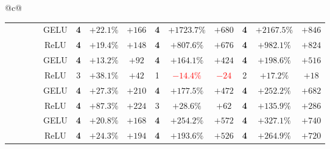 \begin{tabular}{@{}c@{}}
\begin{tabular}{@{}ccccc|ccccccccc@{}}
\hdashline[1pt/3pt]
\xmark & \cmark & \cmark & \cmark & GELU & \textbf{4} & \textcolor{green!55!black}{$+22.1\%$} & \textcolor{green!55!black}{$+166$} & \textbf{4} & \textcolor{green!55!black}{$+1723.7\%$} & \textcolor{green!55!black}{$+680$} & \textbf{4} & \textcolor{green!55!black}{$+2167.5\%$} & \textcolor{green!55!black}{$+846$} \\
\xmark & \cmark & \cmark & \cmark & ReLU & \textbf{4} & \textcolor{green!55!black}{$+19.4\%$} & \textcolor{green!55!black}{$+148$} & \textbf{4} & \textcolor{green!55!black}{$+807.6\%$} & \textcolor{green!55!black}{$+676$} & \textbf{4} & \textcolor{green!55!black}{$+982.1\%$} & \textcolor{green!55!black}{$+824$} \\
\midrule
\cmark & \cmark & \xmark & \xmark & GELU & \textbf{4} & \textcolor{green!55!black}{$+13.2\%$} & \textcolor{green!55!black}{$+92$} & \textbf{4} & \textcolor{green!55!black}{$+164.1\%$} & \textcolor{green!55!black}{$+424$} & \textbf{4} & \textcolor{green!55!black}{$+198.6\%$} & \textcolor{green!55!black}{$+516$} \\
\cmark & \cmark & \xmark & \xmark & ReLU & 3 & \textcolor{green!55!black}{$+38.1\%$} & \textcolor{green!55!black}{$+42$} & 1 & \textcolor{red}{$-14.4\%$} & \textcolor{red}{$-24$} & 2 & \textcolor{green!55!black}{$+17.2\%$} & \textcolor{green!55!black}{$+18$} \\
\hdashline[1pt/3pt]
\cmark & \cmark & \xmark & \cmark & GELU & \textbf{4} & \textcolor{green!55!black}{$+27.3\%$} & \textcolor{green!55!black}{$+210$} & \textbf{4} & \textcolor{green!55!black}{$+177.5\%$} & \textcolor{green!55!black}{$+472$} & \textbf{4} & \textcolor{green!55!black}{$+252.2\%$} & \textcolor{green!55!black}{$+682$} \\
\cmark & \cmark & \xmark & \cmark & ReLU & \textbf{4} & \textcolor{green!55!black}{$+87.3\%$} & \textcolor{green!55!black}{$+224$} & 3 & \textcolor{green!55!black}{$+28.6\%$} & \textcolor{green!55!black}{$+62$} & \textbf{4} & \textcolor{green!55!black}{$+135.9\%$} & \textcolor{green!55!black}{$+286$} \\
\hdashline[1pt/3pt]
\cmark & \cmark & \cmark & \xmark & GELU & \textbf{4} & \textcolor{green!55!black}{$+20.8\%$} & \textcolor{green!55!black}{$+168$} & \textbf{4} & \textcolor{green!55!black}{$+254.2\%$} & \textcolor{green!55!black}{$+572$} & \textbf{4} & \textcolor{green!55!black}{$+327.1\%$} & \textcolor{green!55!black}{$+740$} \\
\cmark & \cmark & \cmark & \xmark & ReLU & \textbf{4} & \textcolor{green!55!black}{$+24.3\%$} & \textcolor{green!55!black}{$+194$} & \textbf{4} & \textcolor{green!55!black}{$+193.6\%$} & \textcolor{green!55!black}{$+526$} & \textbf{4} & \textcolor{green!55!black}{$+264.9\%$} & \textcolor{green!55!black}{$+720$} \\

\end{tabular}
\end{tabular}
